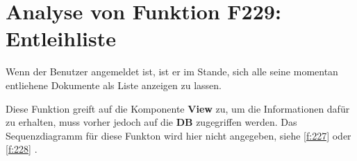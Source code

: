\section{Analyse von Funktion F229: Entleihliste}
Wenn der Benutzer angemeldet ist, ist er im Stande, sich alle seine momentan entliehene Dokumente als Liste anzeigen zu lassen.

Diese Funktion greift auf die Komponente \textbf{View} zu, um die Informationen dafür zu erhalten, muss vorher jedoch auf die \textbf{DB} zugegriffen werden.
Das Sequenzdiagramm für diese Funkton wird hier nicht angegeben, siehe \ref{f:227}  oder \ref{f:228} .
